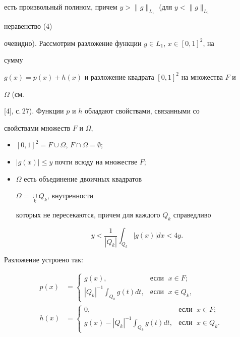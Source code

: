 есть произвольный полином, причем $y>\|g\|_{L_1}$ (для $y<\|g\|_{L_1}$ 


неравенство (4) 


очевидно). Рассмотрим разложение функции $g\in L_1$, $x\in[0,1]^2$, на 


сумму 


$g(x)=p(x)+h(x)$ и разложение квадрата $[0,1]^2$ на множества $F$ и 


$\Omega$ (см. 


[4], с.\,27). Функции $p$ и $h$ обладают свойствами, связанными со 


свойствами множеств $F$ и $\Omega$, 


\begin{itemize} 


\item[1)] $[0,1]^2=F\cup\Omega$, $F\cap\Omega=\emptyset$; 


\item[2)] $|g(x)|\le y$ почти всюду на множестве $F$; 


\item[3)] $\Omega$ есть объединение двоичных квадратов 


$\Omega=\underset{k}{\cup}{}Q_k$, внутренности 


которых не пересекаются, причем для каждого $Q_k$ справедливо 


\begin{equation} 


y<\frac{1}{|Q_k|}\int_{Q_k}|g(x)|dx<4y. 


\end{equation} 


\end{itemize} 


Разложение устроено так: 


\begin{align} 


p(x)&= 


\begin{cases} 


g(x), &\text{если }\; x\in F;\\ 


|Q_k|^{-1}\displaystyle\int_{Q_k}g(t)dt, &\text{если }\; x\in Q_k, 


\end{cases} 


\\ 


h(x)&= 


\begin{cases} 


0, &\text{если }\; x\in F;\\ 


g(x)-|Q_k|^{-1}\displaystyle\int_{Q_k}g(t)dt,&\text{если }\; 


x\in Q_k. 


\end{cases} 


\end{align} 


